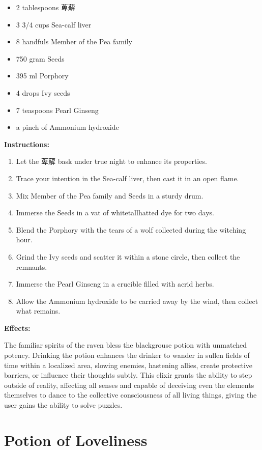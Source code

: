 \documentclass{article}
\begin{document}
\begin{itemize}
  \item 2 tablespoons 萆薢
  \item 3 3/4 cups Sea-calf liver
  \item 8 handfuls Member of the Pea family
  \item 750 gram Seeds
  \item 395 ml Porphory
  \item 4 drops Ivy seeds
  \item 7 teaspoons Pearl Ginseng
  \item a pinch of Ammonium hydroxide
\end{itemize}

\textbf{Instructions:}

\begin{enumerate}
  \item Let the 萆薢 bask under true night to enhance its properties.
  \item Trace your intention in the Sea-calf liver, then cast it in an open flame.
  \item Mix Member of the Pea family and Seeds in a sturdy drum.
  \item Immerse the Seeds in a vat of whitetallhatted dye for two days.
  \item Blend the Porphory with the tears of a wolf collected during the witching hour.
  \item Grind the Ivy seeds and scatter it within a stone circle, then collect the remnants.
  \item Immerse the Pearl Ginseng in a crucible filled with acrid herbs.
  \item Allow the Ammonium hydroxide to be carried away by the wind, then collect what remains.
\end{enumerate}

\textbf{Effects:}

The familiar spirits of the raven bless the blackgrouse potion with unmatched potency. Drinking the potion enhances the drinker to wander in sullen fields of time within a localized area, slowing enemies, hastening allies, create protective barriers, or influence their thoughts subtly. This elixir grants the ability to step outside of reality, affecting all senses and capable of deceiving even the elements themselves to dance to the collective consciousness of all living things, giving the user gains the ability to solve puzzles.

\newpage
\section*{Potion of Loveliness}
\end{document}
